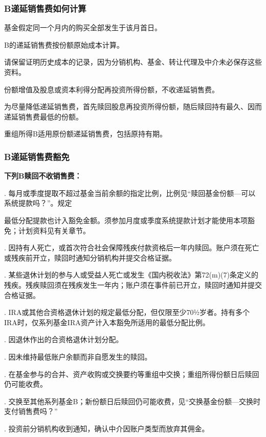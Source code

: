 \documentclass[UTF8,fontset=none,11pt,a4paper]{ctexart}
\begin{document}
\subsubsection*{B递延销售费如何计算}
基金假定同一个月内的购买全部发生于该月首日。

B的递延销售费按份额原始成本计算。

请保留证明历史成本的记录，因为分销机构、基金、转让代理及中介未必保存这些资料。

份额增值及股息或资本利得分配再投资所得份额，不收递延销售费。

为尽量降低递延销售费，首先赎回股息再投资所得份额，随后赎回持有最久、因而递延销售费最低的份额。

重组所得B适用原份额递延销售费，包括原持有期。

\subsubsection*{B递延销售费豁免}
\textbf{下列B赎回不收销售费：}

. 每月或季度提取不超过基金当前余额的指定比例，比例见“赎回基金份额—可以系统提款吗？”。规定


最低分配提款也计入豁免金额。须参加月度或季度系统提款计划才能使用本项豁免；计划资料见有关章节。


. 因持有人死亡，或首次符合社会保障残疾付款资格后一年内赎回。账户须在死亡或残疾前开立，赎回时通知分销机构并提交合格证据。


. 某些退休计划的参与人或受益人死亡或发生《国内税收法》第72(m)(7)条定义的残疾。残疾赎回须在残疾发生一年内；账户须在事件前已开立，赎回时通知并提交合格证据。


. IRA或其他合资格退休计划的规定最低分配，但仅限至少70½岁者。持有多个IRA时，仅系列基金IRA资产计入本豁免所适用的最低分配比例。


. 因退休作出的合资格退休计划分配。


. 因未维持最低账户余额而非自愿发生的赎回。


. 在基金参与的合并、资产收购或交换要约等重组中交换；重组所得份额日后赎回仍可能收费。


. 交换至其他系列基金B；新份额日后赎回仍可能收费，见“交换基金份额—交换时支付销售费吗？”


. 投资前分销机构收到通知，确认中介因账户类型而放弃其佣金。



\par{}\label{originalpage17}
\end{document}
